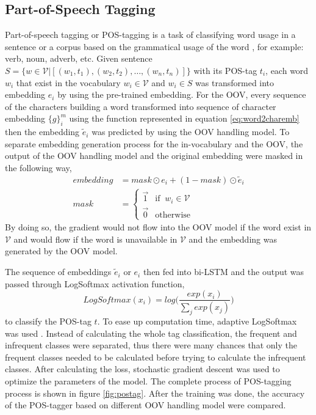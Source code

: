     \subsection{Part-of-Speech Tagging}
        Part-of-speech tagging or POS-tagging is a task of classifying
        word usage in a sentence or a corpus based on the grammatical
        usage of the word \citep{robustpostag2018horsmann}, for
        example: verb, noun, adverb, etc. Given sentence $S = \{w \in
        \mathcal{V} \vert [(w_1, t_1), (w_2, t_2), \dots, (w_n,
        t_n)]\}$ with its POS-tag $t_i$, each word $w_i$ that exist in
        the vocabulary $w_i \in \mathcal{V}$ and $w_i \in S$ was
        transformed into embedding $e_i$ by using the pre-trained embedding. 
        For the OOV, every sequence
        of the characters building a word transformed into sequence of
        character embedding $\{g\}_{i}^m$ using the function represented in
        equation \ref{eq:word2charemb} then the embedding
        $\tilde{e}_i$ was predicted by using the OOV handling model. 
        To separate embedding generation process for the in-vocabulary and the OOV,
        the output
        of the OOV handling model and the original embedding were masked in the
        following way,
        \begin{align}
            \label{eq:embeddingmask}
            embedding &= mask \odot e_i + (1-mask) \odot \tilde{e}_i\\
            mask &=
            \begin{cases}
                \vec{1} & \text{if }\ w_i \in \mathcal{V}\\
                \vec{0} & \text{otherwise}
            \end{cases}
        \end{align}        
        By doing so, the gradient would not flow into the OOV model if
        the word exist in $\mathcal{V}$ and would flow if the word is
        unavailable in $\mathcal{V}$ and the embedding was generated
        by the OOV model.

        The sequence of embeddings $\tilde{e}_i$ or $e_i$ then fed
        into bi-LSTM and the output was passed through LogSoftmax
        activation function,
        \begin{equation}
            \label{eq:logsoftmax}
            LogSoftmax(x_i) = log \Bigg(\frac{exp(x_i)}{\sum_j exp(x_j)}\Bigg)
        \end{equation}
        to classify the POS-tag $t$. To ease up computation time,
        adaptive LogSoftmax was used \citep{grave2018efficientsoftmax}.
        Instead of calculating the whole tag classification, the
        frequent and infrequent classes were separated, thus there were
        many chances that only the frequent classes needed to be calculated
        before trying to calculate the infrequent classes. After
        calculating the loss, stochastic gradient descent was used to
        optimize the parameters of the model. The complete process of
        POS-tagging process is shown in figure \ref{fig:postag}. After
        the training was done, the accuracy of the POS-tagger based on
        different OOV handling model were compared.

